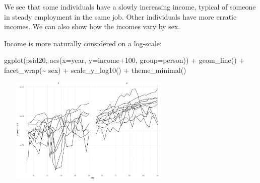 \documentclass[
  ignorenonframetext,
]{beamer}
\newenvironment{Shaded}{\begin{snugshade}}{\end{snugshade}}
\newcommand{\AttributeTok}[1]{\textcolor[rgb]{0.77,0.63,0.00}{#1}}
\newcommand{\DecValTok}[1]{\textcolor[rgb]{0.00,0.00,0.81}{#1}}
\newcommand{\FunctionTok}[1]{\textcolor[rgb]{0.00,0.00,0.00}{#1}}
\newcommand{\NormalTok}[1]{#1}
\newcommand{\SpecialCharTok}[1]{\textcolor[rgb]{0.00,0.00,0.00}{#1}}
\begin{document}
\begin{frame}[fragile]{}
\protect\hypertarget{section-20}{}
We see that some individuals have a slowly increasing income, typical of
someone in steady employment in the same job. Other individuals have
more erratic incomes. We can also show how the incomes vary by sex.

Income is more naturally considered on a log-scale:

\vspace{12pt}
\tiny

\begin{Shaded}
\begin{Highlighting}[]
\FunctionTok{ggplot}\NormalTok{(psid20, }\FunctionTok{aes}\NormalTok{(}\AttributeTok{x=}\NormalTok{year, }\AttributeTok{y=}\NormalTok{income}\SpecialCharTok{+}\DecValTok{100}\NormalTok{, }\AttributeTok{group=}\NormalTok{person)) }\SpecialCharTok{+} 
  \FunctionTok{geom\_line}\NormalTok{() }\SpecialCharTok{+} \FunctionTok{facet\_wrap}\NormalTok{(}\SpecialCharTok{\textasciitilde{}}\NormalTok{ sex) }\SpecialCharTok{+} \FunctionTok{scale\_y\_log10}\NormalTok{() }\SpecialCharTok{+} \FunctionTok{theme\_minimal}\NormalTok{()}
\end{Highlighting}
\end{Shaded}

\includegraphics[width=3.5in,height=2in]{week11p2_files/figure-beamer/unnamed-chunk-15-1}
\end{frame}
\end{document}
